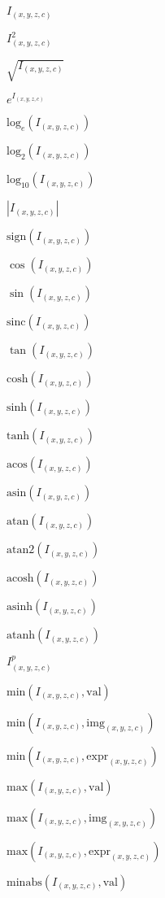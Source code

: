 \documentclass{article}
\begin{document}
$I_{(x,y,z,c)}$
\pagebreak

$I_{(x,y,z,c)}^2$
\pagebreak

$\sqrt{I_{(x,y,z,c)}}$
\pagebreak

$e^{I_{(x,y,z,c)}}$
\pagebreak

$\mathrm{log}_{e}(I_{(x,y,z,c)})$
\pagebreak

$\mathrm{log}_{2}(I_{(x,y,z,c)})$
\pagebreak

$\mathrm{log}_{10}(I_{(x,y,z,c)})$
\pagebreak

$|I_{(x,y,z,c)}|$
\pagebreak

$\mathrm{sign}(I_{(x,y,z,c)})$
\pagebreak

$\cos(I_{(x,y,z,c)})$
\pagebreak

$\sin(I_{(x,y,z,c)})$
\pagebreak

$\mathrm{sinc}(I_{(x,y,z,c)})$
\pagebreak

$\tan(I_{(x,y,z,c)})$
\pagebreak

$\mathrm{cosh}(I_{(x,y,z,c)})$
\pagebreak

$\mathrm{sinh}(I_{(x,y,z,c)})$
\pagebreak

$\mathrm{tanh}(I_{(x,y,z,c)})$
\pagebreak

$\mathrm{acos}(I_{(x,y,z,c)})$
\pagebreak

$\mathrm{asin}(I_{(x,y,z,c)})$
\pagebreak

$\mathrm{atan}(I_{(x,y,z,c)})$
\pagebreak

$\mathrm{atan2}(I_{(x,y,z,c)})$
\pagebreak

$\mathrm{acosh}(I_{(x,y,z,c)})$
\pagebreak

$\mathrm{asinh}(I_{(x,y,z,c)})$
\pagebreak

$\mathrm{atanh}(I_{(x,y,z,c)})$
\pagebreak

$I_{(x,y,z,c)}^p$
\pagebreak

$\mathrm{min}(I_{(x,y,z,c)},\mathrm{val})$
\pagebreak

$\mathrm{min}(I_{(x,y,z,c)},\mathrm{img}_{(x,y,z,c)})$
\pagebreak

$\mathrm{min}(I_{(x,y,z,c)},\mathrm{expr}_{(x,y,z,c)})$
\pagebreak

$\mathrm{max}(I_{(x,y,z,c)},\mathrm{val})$
\pagebreak

$\mathrm{max}(I_{(x,y,z,c)},\mathrm{img}_{(x,y,z,c)})$
\pagebreak

$\mathrm{max}(I_{(x,y,z,c)},\mathrm{expr}_{(x,y,z,c)})$
\pagebreak

$\mathrm{minabs}(I_{(x,y,z,c)},\mathrm{val})$
\pagebreak
\end{document}
